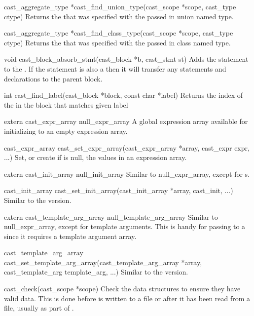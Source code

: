 \begin{cprototypelist}
  \item[cast_aggregate_type *cast_find_union_type(cast_scope
  *scope, cast_type ctype)] Returns the  that was
  specified with the passed in union named type.

  \item[cast_aggregate_type *cast_find_class_type(cast_scope
  *scope, cast_type ctype)] Returns the  that was
  specified with the passed in class named type.

  \item[void cast_block_absorb_stmt(cast_block *b, cast_stmt st)]
  Adds the statement to the .  If the statement is also a
   then it will transfer any statements and declarations to
  the parent block.

  \item[int cast_find_label(cast_block *block, const char *label)]
  Returns the index of the  in the block that matches given
  label

  \item[extern cast_expr_array null_expr_array] A global
  expression array available for initializing to an empty expression array.

  \item[cast_expr_array cast_set_expr_array(cast_expr_array *array, cast_expr
  expr, ...)] Set, or create if  is null, the values in an
  expression array.

  \item[extern cast_init_array null_init_array] Similar to
  null_expr_array, except for s.

  \item[cast_init_array cast_set_init_array(cast_init_array *array,
  cast_init, ...)] Similar to the  version.

  \item[extern cast_template_arg_array null_template_arg_array]
  Similar to null_expr_array, except for template arguments.  This is handy for
  passing to a  since it requires a template
  argument array.

  \item[cast_template_arg_array
  cast_set_template_arg_array(cast_template_arg_array *array, cast_template_arg
  template_arg, ...)]
  Similar to the  version.

  \item[cast_check(cast_scope *scope)] Check the data structures to ensure they
  have valid data.  This is done before \CAST{} is written to a file or after
  it has been read from a file, usually as part of .


\end{cprototypelist}
